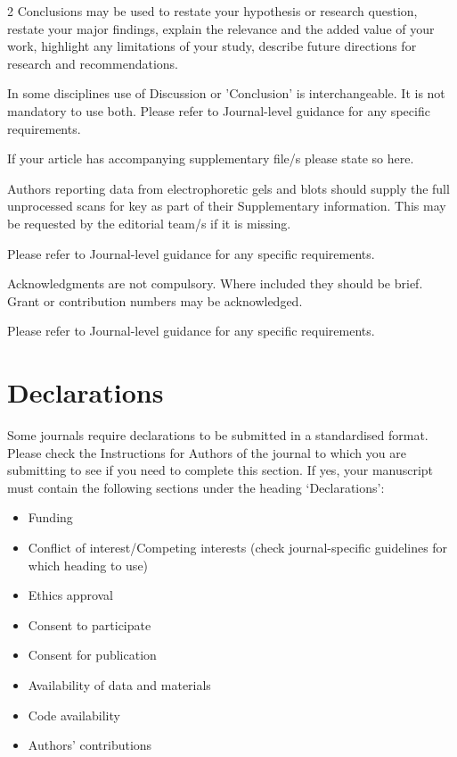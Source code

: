 \documentclass[sn-mathphys,Numbered]{sn-jnl}%
\begin{document}
\begin{multicols}{2}
Conclusions may be used to restate your hypothesis or research question, restate your major findings, explain the relevance and the added value of your work, highlight any limitations of your study, describe future directions for research and recommendations. 

In some disciplines use of Discussion or 'Conclusion' is interchangeable. It is not mandatory to use both. Please refer to Journal-level guidance for any specific requirements. 

\backmatter


If your article has accompanying supplementary file/s please state so here. 

Authors reporting data from electrophoretic gels and blots should supply the full unprocessed scans for key as part of their Supplementary information. This may be requested by the editorial team/s if it is missing.

Please refer to Journal-level guidance for any specific requirements.


Acknowledgments are not compulsory. Where included they should be brief. Grant or contribution numbers may be acknowledged.

Please refer to Journal-level guidance for any specific requirements.

\section*{Declarations}

Some journals require declarations to be submitted in a standardised format. Please check the Instructions for Authors of the journal to which you are submitting to see if you need to complete this section. If yes, your manuscript must contain the following sections under the heading `Declarations':

\begin{itemize}
\item Funding
\item Conflict of interest/Competing interests (check journal-specific guidelines for which heading to use)
\item Ethics approval 
\item Consent to participate
\item Consent for publication
\item Availability of data and materials
\item Code availability 
\item Authors' contributions
\end{itemize}


\end{multicols}
\end{document}
